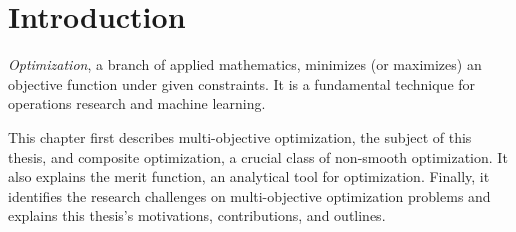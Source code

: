 \documentclass[../main]{subfiles}
\begin{document}
\chapter{Introduction} 
\emph{Optimization}, a branch of applied mathematics, minimizes (or maximizes) an objective function under given constraints.
It is a fundamental technique for operations research and machine learning.

This chapter first describes multi-objective optimization, the subject of this thesis, and composite optimization, a crucial class of non-smooth optimization.
It also explains the merit function, an analytical tool for optimization.
Finally, it identifies the research challenges on multi-objective optimization problems and explains this thesis's motivations, contributions, and outlines.










\end{document}
